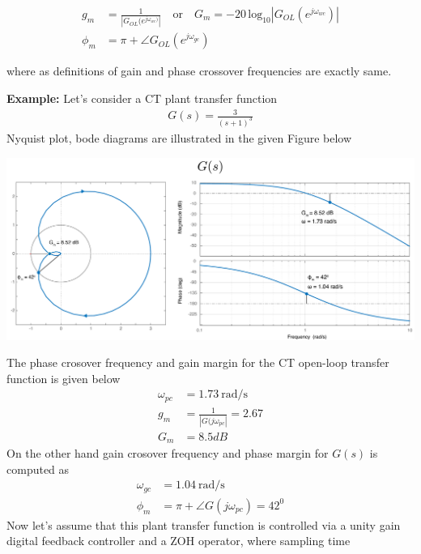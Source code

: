 \documentclass[twoside]{article}
\begin{document}
\begin{align*}
    g_m &= \frac{1}{| G_{OL}(e^{j \omega_{wc})} |} \quad \mathrm{or} \quad G_m
  = -20 \,
  \mathrm{log}_{10} | G_{OL}(e^{j \omega_{wc} }) |
\\
  \phi_m &= \pi + \angle G_{OL} (e^{j \omega_{gc}})
\end{align*}

where as definitions of gain and phase crossover frequencies are 
exactly same.

\textbf{Example:} Let's consider a CT plant transfer function
%
\begin{align*}
  G(s) = \frac{3}{(s+1)^3}
\end{align*}
%
Nyquist plot, bode diagrams are illustrated in the given Figure below
%
\begin{center}
\begin{minipage}[h]{\linewidth}
    \begin{center}
      \includegraphics[width=\textwidth]{Gp}
    \end{center}
\end{minipage}
\end{center}
%
The phase crosover frequency and gain margin for the CT open-loop
transfer function is given below
%
\begin{align*}
\omega_{pc} &= 1.73 \ \mathrm{rad/s} 
\\
g_m &= \frac{1}{| G(j \omega_{pc}|} = 2.67 
\\
G_m &= 8.5 dB
\end{align*}
%
On the other hand gain crosover frequency and phase margin 
for $G(s)$ is computed as
%
\begin{align*}
\omega_{gc} &= 1.04 \ \mathrm{rad/s} 
\\
\phi_m &= \pi + \angle G(j \omega_{pc}) = 42^0
\end{align*}
%
Now let's assume that this plant transfer function
is controlled via a unity gain digital feedback 
controller and a ZOH operator, where sampling time
\end{document}
